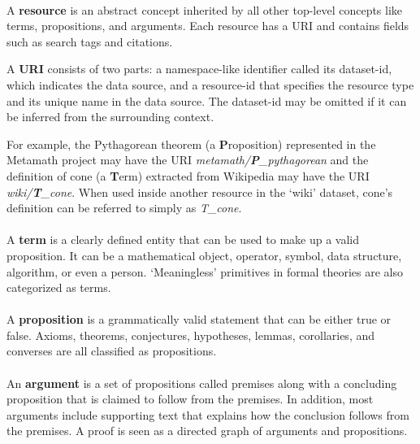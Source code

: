 \documentclass[]{ceurart}
\begin{document}
\paragraph{}A \textbf{resource} is an abstract concept inherited by all other top-level concepts like terms, propositions, and arguments. Each resource has a URI and contains fields such as search tags and citations.

A \textbf{URI} consists of two parts: a namespace-like identifier called its dataset-id, which indicates the data source, and a resource-id that specifies the resource type and its unique name in the data source. The dataset-id may be omitted if it can be inferred from the surrounding context.

For example, the Pythagorean theorem (a \textbf{P}roposition) represented in the Metamath project may have the URI \emph{metamath/\textbf{P}\_pythagorean} and the definition of cone (a \textbf{T}erm) extracted from Wikipedia may have the URI \emph{wiki/\textbf{T}\_cone}. When used inside another resource in the `wiki' dataset, cone's definition can be referred to simply as \emph{T\_cone}.

\paragraph{}A \textbf{term} is a clearly defined entity that can be used to make up a valid proposition. It can be a mathematical object, operator, symbol, data structure, algorithm, or even a person. `Meaningless' primitives in formal theories are also categorized as terms.

\paragraph{}A \textbf{proposition} is a grammatically valid statement that can be either true or false. Axioms, theorems, conjectures, hypotheses, lemmas, corollaries, and converses are all classified as propositions.

\paragraph{}An \textbf{argument} is a set of propositions called premises along with a concluding proposition that is claimed to follow from the premises. In addition, most arguments include supporting text that explains how the conclusion follows from the premises. A proof is seen as a directed graph of arguments and propositions.
\end{document}
